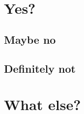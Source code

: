 \lipsum[1-2]

\section{Yes?}

\subsection{Maybe no}

  \lipsum[3]

\subsection{Definitely not}
  \lipsum[4]
  
\section{What else?}
  \lipsum[5-13]